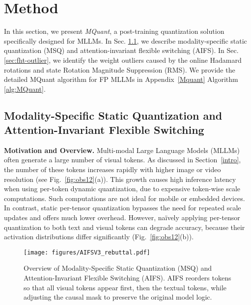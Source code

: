 \section{Method}\label{sec: method}

\vspace{-2mm}
In this section, we present \emph{MQuant}, a post-training quantization solution specifically designed for MLLMs. In Sec. \ref{UniToekn}, we describe modality-specific static quantization (MSQ) and attention-invariant flexible switching (AIFS). In Sec. \ref{sec:fht-outlier}, we identify the weight outliers caused by the online Hadamard rotations and state Rotation Magnitude Suppression (RMS). We provide the detailed MQuant algorithm for FP MLLMs in Appendix~\ref{Mquant} Algorithm \ref{alg:MQuant}.



\subsection{Modality-Specific Static Quantization and Attention-Invariant Flexible Switching}
\label{UniToekn}

\noindent
\textbf{Motivation and Overview.}
Multi-modal Large Language Models (MLLMs) often generate a large number of visual tokens. As discussed in Section~\ref{intro}, the number of these tokens increases rapidly with higher image or video resolution (see Fig.~\ref{fig:obs12}(a)). This growth causes high inference latency when using per-token dynamic quantization, due to expensive token-wise scale computations. Such computations are not ideal for mobile or embedded devices. In contrast, static per-tensor quantization bypasses the need for repeated scale updates and offers much lower overhead. However, na\"ively applying per-tensor quantization to both text and visual tokens can degrade accuracy, because their activation distributions differ significantly (Fig.~\ref{fig:obs12}(b)).

\begin{figure}[h]
    \centering
    \texttt{[image: figures/AIFSV3\_rebuttal.pdf]}
    \vspace{-1.5mm}
    \caption{Overview of Modality-Specific Static Quantization (MSQ) and Attention-Invariant Flexible Switching (AIFS). AIFS reorders tokens so that all visual tokens appear first, then the textual tokens, while adjusting the causal mask to preserve the original model logic.}
    \label{fig:AIFS}
    \vspace{-4mm}
\end{figure}

